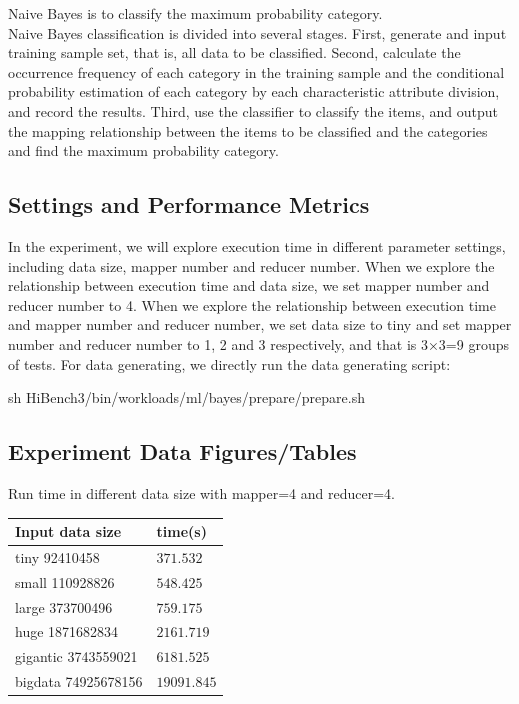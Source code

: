 Naive Bayes is to classify the maximum probability category.\\

Naive Bayes classification is divided into several stages. First, generate and input training sample set, that is, all data to be classified. Second, calculate the occurrence frequency of each category in the training sample and the conditional probability estimation of each category by each characteristic attribute division, and record the results. Third, use the classifier to classify the items, and output the mapping relationship between the items to be classified and the categories and find the  maximum probability category.

\subsection{Settings and Performance Metrics}
In the experiment, we will explore execution time in different parameter settings, including data size, mapper number and reducer number.
When we explore the relationship between execution time and data size, we set mapper number and reducer number to 4. When we explore the relationship between execution time and mapper number and reducer number, we set data size to tiny and set mapper number and reducer number to 1, 2 and 3 respectively, and that is 3×3=9 groups of tests.
For data generating, we directly run the data generating script:

sh HiBench3/bin/workloads/ml/bayes/prepare/prepare.sh

\subsection{Experiment Data Figures/Tables}
Run time in different data size with mapper=4 and reducer=4.\\
\begin{center}
\begin{tabular}{|l|l|}
    \hline Input data size & time(s) \\
    \hline tiny 92410458 & $371.532$ \\
    \hline small 110928826 & $548.425$ \\
    \hline large 373700496 & $759.175$ \\
    \hline huge 1871682834 & $2161.719$ \\
    \hline gigantic 3743559021 & $6181.525$ \\
    \hline bigdata 74925678156 & $19091.845$ \\
    \hline
\end{tabular}
\end{center}

